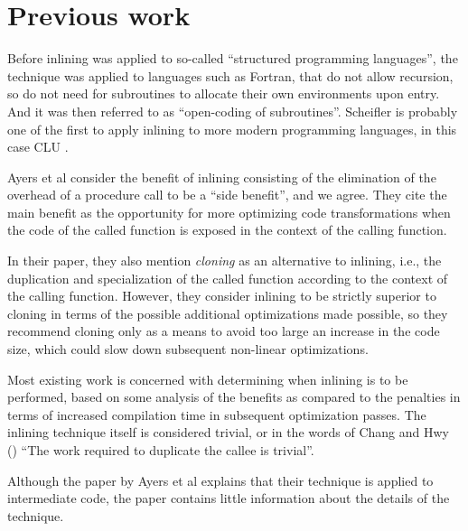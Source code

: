 \section{Previous work}

Before inlining was applied to so-called ``structured programming
languages'', the technique was applied to languages such as Fortran,
that do not allow recursion, so do not need for subroutines to
allocate their own environments upon entry.  And it was then referred
to as ``open-coding of subroutines''.  Scheifler
\cite{Scheifler:1977:AIS:359810.359830} is probably one of the first
to apply inlining to more modern programming languages, in this case
CLU \cite{Liskov:1977:AMC:359763.359789}.

Ayers et al \cite{Ayers:1997:AI:258915.258928} consider the benefit of
inlining consisting of the elimination of the overhead of a procedure
call to be a ``side benefit'', and we agree.  They cite the main
benefit as the opportunity for more optimizing code transformations
when the code of the called function is exposed in the context of the
calling function.

In their paper, they also mention \emph{cloning} as an alternative to
inlining, i.e., the duplication and specialization of the called
function according to the context of the calling function.  However,
they consider inlining to be strictly superior to cloning in terms of
the possible additional optimizations made possible, so they recommend
cloning only as a means to avoid too large an increase in the code
size, which could slow down subsequent non-linear optimizations.

Most existing work is concerned with determining when inlining is to
be performed, based on some analysis of the benefits as compared to
the penalties in terms of increased compilation time in subsequent
optimization passes.  The inlining technique itself is considered
trivial, or in the words of Chang and Hwy
(\cite{Chang:1989:IFE:73141.74840, Chang:1989:IFE:74818.74840}) ``The
work required to duplicate the callee is trivial''.

Although the paper by Ayers et al explains that their technique is
applied to intermediate code, the paper contains little information
about the details of the technique.

